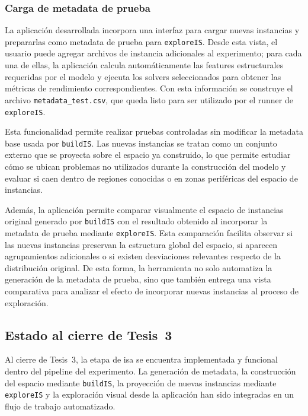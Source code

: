 \subsubsection{Carga de metadata de prueba}
\label{subsec:avance_explore_is_metadata_prueba}

La aplicación desarrollada incorpora una interfaz para cargar nuevas instancias y
prepararlas como metadata de prueba para \texttt{exploreIS}.
Desde esta vista, el usuario puede agregar archivos de instancia adicionales al
experimento; para cada una de ellas, la aplicación calcula automáticamente las
features estructurales requeridas por el modelo y ejecuta los solvers seleccionados
para obtener las métricas de rendimiento correspondientes.
Con esta información se construye el archivo \texttt{metadata\_test.csv}, que queda
listo para ser utilizado por el runner de \texttt{exploreIS}.

Esta funcionalidad permite realizar pruebas controladas sin modificar la metadata
base usada por \texttt{buildIS}.
Las nuevas instancias se tratan como un conjunto externo que se proyecta sobre el
espacio ya construido, lo que permite estudiar cómo se ubican problemas no utilizados
durante la construcción del modelo y evaluar si caen dentro de regiones conocidas o
en zonas periféricas del espacio de instancias.

Además, la aplicación permite comparar visualmente el espacio de instancias original
generado por \texttt{buildIS} con el resultado obtenido al incorporar la metadata de
prueba mediante \texttt{exploreIS}.
Esta comparación facilita observar si las nuevas instancias preservan la estructura
global del espacio, si aparecen agrupamientos adicionales o si existen desviaciones
relevantes respecto de la distribución original.
De esta forma, la herramienta no solo automatiza la generación de la metadata de
prueba, sino que también entrega una vista comparativa para analizar el efecto de
incorporar nuevas instancias al proceso de exploración.

\subsection{Estado al cierre de Tesis~3}
\label{subsec:avance_isa_estado}

Al cierre de Tesis~3, la etapa de \acrshort{isa} se encuentra implementada y
funcional dentro del pipeline del experimento.
La generación de metadata, la construcción del espacio mediante \texttt{buildIS}, la
proyección de nuevas instancias mediante \texttt{exploreIS} y la exploración visual
desde la aplicación han sido integradas en un flujo de trabajo automatizado.

